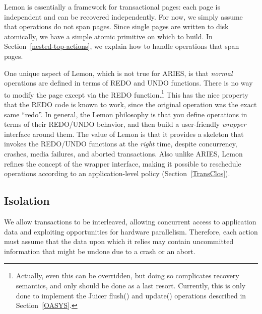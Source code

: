 \documentclass[10pt,letterpaper,twocolumn,english]{article}
\newcommand{\yad}{Lemon\xspace}
\newcommand{\oasys}{Juicer\xspace}
\begin{document}
\yad is essentially a framework for transactional pages: each page is
independent and can be recovered independently. For now, we simply
assume that operations do not span pages.  Since single pages are
written to disk atomically, we have a simple atomic primitive on which
to build. In Section~\ref{nested-top-actions}, we explain how to
handle operations that span pages.

One unique aspect of \yad, which is not true for ARIES, is that {\em
normal} operations are defined in terms of REDO and UNDO
functions. There is no way to modify the page except via the REDO
function.\footnote{Actually, even this can be overridden, but doing so
complicates recovery semantics, and only should be done as a last
resort.  Currently, this is only done to implement the \oasys flush()
and update() operations described in Section~\ref{OASYS}.}  This has
the nice property that the REDO code is known to work, since the
original operation was the exact same ``redo''.  In general, the \yad
philosophy is that you define operations in terms of their REDO/UNDO
behavior, and then build a user-friendly {\em wrapper} interface
around them.  The value of \yad is that it provides a skeleton that
invokes the REDO/UNDO functions at the {\em right} time, despite
concurrency, crashes, media failures, and aborted transactions.  Also
unlike ARIES, \yad refines the concept of the wrapper interface,
making it possible to reschedule operations according to an
application-level policy (Section~\ref{TransClos}).



\subsection{Isolation}
\label{Isolation}

We allow transactions to be interleaved, allowing concurrent access to
application data and exploiting opportunities for hardware
parallelism.  Therefore, each action must assume that the
data upon which it relies may contain uncommitted
information that might be undone due to a crash or an abort.

\end{document}
